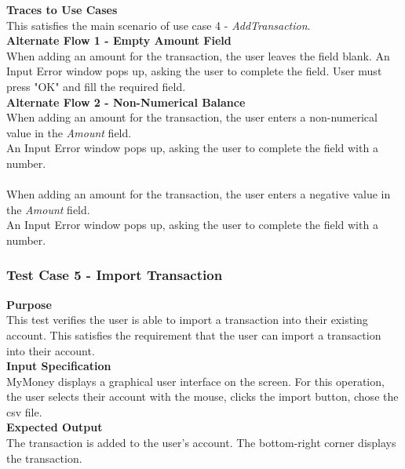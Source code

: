 \documentclass[12pt]{article}
\begin{document}
\noindent
{\bf Traces to Use Cases}\\
This satisfies the main scenario of use case 4 - \textit{AddTransaction}.\\

\noindent
{\bf Alternate Flow 1 - Empty Amount Field}\\
When adding an amount for the transaction, the user leaves the field blank.
An Input Error window pops up, asking the user to complete the field. User must press "OK" and fill the required field.\\

\noindent
{\bf Alternate Flow 2 - Non-Numerical Balance}\\
When adding an amount for the transaction, the user enters a non-numerical value in the \textit{Amount} field. \\
An Input Error window pops up, asking the user to complete the field with a number. \\

\\
When adding an amount for the transaction, the user enters a negative value in the \textit{Amount} field. \\
An Input Error window pops up, asking the user to complete the field with a number. \\

\clearpage 

\subsubsection{Test Case 5 - Import Transaction} \label{TC-5}

\noindent
{\bf Purpose}\\
This test verifies the user is able to import a transaction into their existing account.
This satisfies the requirement that the user can import a transaction into their account.\\
                                                    
\noindent
{\bf Input Specification}\\
MyMoney displays a graphical user interface on the screen.
For this operation, the user selects their account with the mouse,
clicks the import button, chose the csv file.\\
                                                    
\noindent
{\bf Expected Output}\\
The transaction is added to the user's account.
The bottom-right corner displays the transaction.\\
\end{document}
